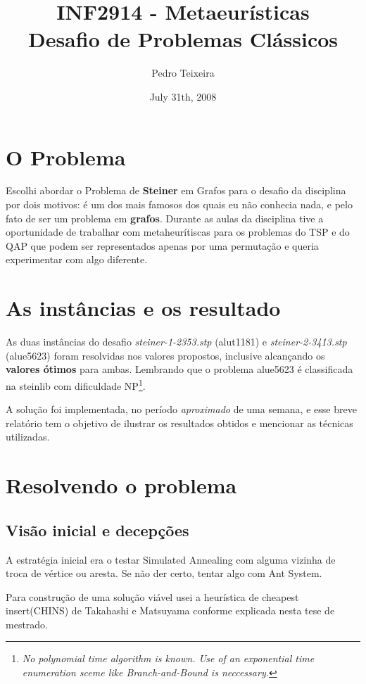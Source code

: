 \documentclass[a4paper,10pt,brazilian]{article}
\title{INF2914 - Metaeurísticas \\ Desafio de Problemas Clássicos}
\author{Pedro Teixeira}
\date{July 31th, 2008}
\begin{document}
\maketitle

\section{O Problema}

Escolhi abordar o Problema de \textbf{Steiner} em Grafos para o desafio da disciplina por dois motivos: é um dos mais famosos dos quais eu não conhecia nada, e pelo fato de ser um problema em \textbf{grafos}. Durante as aulas da disciplina tive a oportunidade de trabalhar com metaheurítiscas para os problemas do TSP e do QAP que podem ser representados apenas por uma permutação e queria experimentar com algo diferente.

\section{As instâncias e os resultado}

As duas instâncias do desafio \textit{steiner-1-2353.stp} (alut1181) e \textit{steiner-2-3413.stp} (alue5623) foram resolvidas nos valores propostos, inclusive alcançando os \textbf{valores ótimos} para ambas. Lembrando que o problema alue5623 é classificada na steinlib com dificuldade NP\footnote{\textit{No polynomial time algorithm is known. Use of an exponential time enumeration sceme like Branch-and-Bound is neccessary.}}.

A solução foi implementada, no período \textit{aproximado} de uma semana, e esse breve relatório tem o objetivo de ilustrar os resultados obtidos e mencionar as técnicas utilizadas.

\section{Resolvendo o problema}

\subsection{Visão inicial e decepções}
A estratégia inicial era o testar Simulated Annealing com alguma vizinha de troca de vértice ou aresta. Se não der certo, tentar algo com Ant System.

Para construção de uma solução viável usei a heurística de cheapest insert(CHINS) de Takahashi e Matsuyama conforme explicada nesta tese de mestrado\cite{tabu}.
\end{document}
